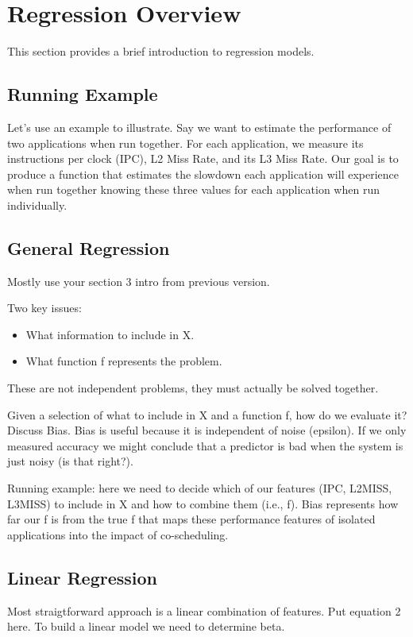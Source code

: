 \section{Regression Overview}
\label{sec:reg-background}

This section provides a brief introduction to regression models.

\subsection{Running Example}
Let's use an example to illustrate.  Say we want to estimate the
performance of two applications when run together.  For each
application, we measure its instructions per clock (IPC), L2 Miss
Rate, and its L3 Miss Rate.  Our goal is to produce a function that
estimates the slowdown each application will experience when run
together knowing these three values for each application when run
individually.

\subsection{General Regression}

Mostly use your section 3 intro from previous version.

Two key issues:
\begin{itemize}
\item What information to include in X.
\item What function f represents the problem.
\end{itemize}
These are not independent problems, they must actually be solved together.

Given a selection of what to include in X and a function f, how do we
evaluate it?  Discuss Bias.  Bias is useful because it is independent
of noise (epsilon).  If we only measured accuracy we might conclude
that a predictor is bad when the system is just noisy (is that
right?).

Running example: here we need to decide which of our features (IPC,
L2MISS, L3MISS) to include in X and how to combine them (i.e., f).
Bias represents how far our f is from the true f that maps these
performance features of isolated applications into the impact of
co-scheduling.

\subsection{Linear Regression}
Most straigtforward approach is a linear combination of features. Put
equation 2 here.  To build a linear model we need to determine beta.

